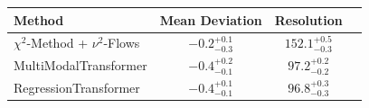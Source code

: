     \begin{tabular}{lccc}
        \toprule
        Method & Mean Deviation & Resolution \\
        \midrule
        $\chi^2$-Method + $\nu^2$-Flows & $-0.2_{-0.3}^{+0.1}$ & $152.1_{-0.3}^{+0.5}$ \\
        MultiModalTransformer & $-0.4_{-0.1}^{+0.2}$ & $97.2_{-0.2}^{+0.2}$ \\
        RegressionTransformer & $-0.4_{-0.1}^{+0.1}$ & $96.8_{-0.3}^{+0.3}$ \\
        \bottomrule
    \end{tabular}